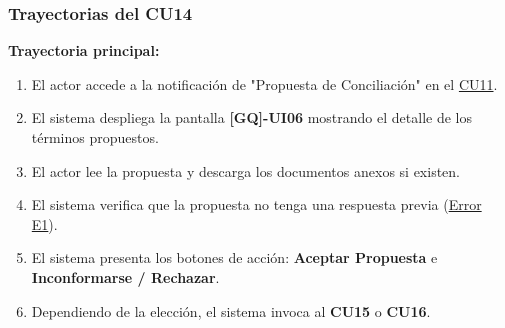 \begin{appendices}
\subsubsection{Trayectorias del CU14}
\textbf{Trayectoria principal:}
\begin{enumerate}[nosep]
    \item El actor accede a la notificación de "Propuesta de Conciliación" en el \hyperlink{anexo:casos_uso}{CU11}.
    \item El sistema despliega la pantalla \textbf{[GQ]-UI06} mostrando el detalle de los términos propuestos.
    \item El actor lee la propuesta y descarga los documentos anexos si existen.
    \item El sistema verifica que la propuesta no tenga una respuesta previa (\hyperlink{err:E19}{Error E1}).
    \item El sistema presenta los botones de acción: \textbf{Aceptar Propuesta} e \textbf{Inconformarse / Rechazar}.
    \item Dependiendo de la elección, el sistema invoca al \textbf{CU15} o \textbf{CU16}.
\end{enumerate}


\end{appendices}
